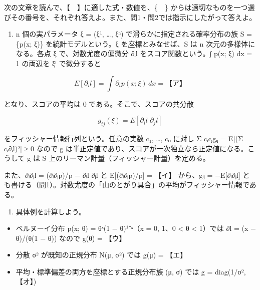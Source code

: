 \documentclass[
  10pt,
  a4paper,
]{article}
\providecommand{\tightlist}{%
  \setlength{\itemsep}{0pt}\setlength{\parskip}{0pt}}
\begin{document}
次の文章を読んで、【　】に適した式・数値を、\{　\}
からは適切なものを一つ選びその番号を、それぞれ答えよ。また、問1・問2では指示にしたがって答えよ。

\begin{enumerate}
\def\labelenumi{(\arabic{enumi})}
\tightlist
\item
  n 個の実パラメータ ξ = (ξ¹, \ldots, ξ{\fallbackfont ⁿ})
  で滑らかに指定される確率分布の族 S = \{p(x; ξ)\} を統計モデルという。ξ
  を座標とみなせば、S は n 次元の多様体になる。各点 ξ
  で、対数尤度の偏微分 ∂{\fallbackfont ᵢ}l をスコア関数という。∫ p(x; ξ)
  dx = 1 の両辺を ξ{\fallbackfont ⁱ} で微分すると
\end{enumerate}

\[E[\partial_i l] = \int \partial_i p(x;\xi)\, dx = \text{【ア】}\]

となり、スコアの平均は 0 である。そこで、スコアの共分散

\[g_{ij}(\xi) = E[\partial_i l\; \partial_j l]\]

をフィッシャー情報行列という。任意の実数 c{\fallbackfont ₁}, \ldots,
c{\fallbackfont ₙ} に対し Σ
c{\fallbackfont ᵢ}c{\fallbackfont ⱼ}g{\fallbackfont ᵢⱼ} = E{[}(Σ
c{\fallbackfont ᵢ}∂{\fallbackfont ᵢ}l)²{]} ≥ 0 なので g
は半正定値であり、スコアが一次独立なら正定値になる。こうして g は S
上のリーマン計量（フィッシャー計量）を定める。

また、∂{\fallbackfont ᵢ}∂{\fallbackfont ⱼ}l =
(∂{\fallbackfont ᵢ}∂{\fallbackfont ⱼ}p)/p − ∂{\fallbackfont ᵢ}l
∂{\fallbackfont ⱼ}l と E{[}(∂{\fallbackfont ᵢ}∂{\fallbackfont ⱼ}p)/p{]}
= 【イ】 から、g{\fallbackfont ᵢⱼ} =
−E{[}∂{\fallbackfont ᵢ}∂{\fallbackfont ⱼ}l{]}
とも書ける（問1）。対数尤度の「山のとがり具合」の平均がフィッシャー情報である。

\begin{enumerate}
\def\labelenumi{(\arabic{enumi})}
\setcounter{enumi}{1}
\tightlist
\item
  具体例を計算しよう。
\end{enumerate}

\begin{itemize}
\tightlist
\item
  ベルヌーイ分布 p(x; θ) = θ{\fallbackfont ˣ}(1 −
  θ)¹{\fallbackfont ⁻ˣ}（x = 0, 1、0 \textless{} θ \textless{} 1）では
  ∂l = (x − θ)/(θ(1 − θ)) なので g(θ) = 【ウ】
\item
  分散 σ² が既知の正規分布 N(μ, σ²) では g(μ) = 【エ】
\item
  平均・標準偏差の両方を座標とする正規分布族 (μ, σ) では g = diag(1/σ²,
  【オ】)
\end{itemize}
\end{document}
